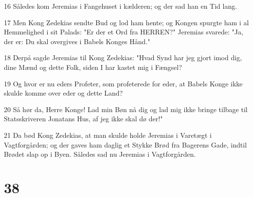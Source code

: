 \par 16 Således kom Jeremias i Fangehuset i kælderen; og der sad han en Tid lang.
\par 17 Men Kong Zedekias sendte Bud og lod ham hente; og Kongen spurgte ham i al Hemmelighed i sit Palads: "Er der et Ord fra HERREN?" Jeremias svarede: "Ja, der er: Du skal overgives i Babels Konges Hånd."
\par 18 Derpå sagde Jeremias til Kong Zedekias: "Hvad Synd har jeg gjort imod dig, dine Mænd og dette Folk, siden I har kastet mig i Fængsel?
\par 19 Og hvor er nu eders Profeter, som profeterede for eder, at Babels Konge ikke skulde komme over eder og dette Land?
\par 20 Så hør da, Herre Konge! Lad min Bøn nå dig og lad mig ikke bringe tilbage til Statsskriveren Jonatans Hus, af jeg ikke skal dø der!"
\par 21 Da bød Kong Zedekias, at man skulde holde Jeremias i Varetægt i Vagtforgården; og der gaves ham daglig et Stykke Brød fra Bagerens Gade, indtil Brødet slap op i Byen. Således sad nu Jeremias i Vagtforgården.

\chapter{38}

